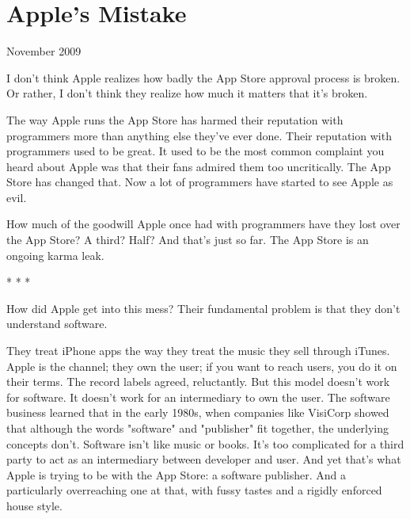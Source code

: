 \chapter{Apple's Mistake}


            
              
                


                  
                    November 2009

I don't think Apple realizes how
                    badly the App Store approval process is broken. Or rather, I
                    don't think they realize how much it matters that it's
                    broken.

The way Apple runs the App Store has
                    harmed their reputation with programmers more than anything
                    else they've ever done. Their reputation with programmers
                    used to be great. It used to be the most common complaint
                    you heard about Apple was that their fans admired them too
                    uncritically. The App Store has changed that. Now a lot of
                    programmers have started to see Apple as evil.

How
                    much of the goodwill Apple once had with programmers have
                    they lost over the App Store? A third? Half? And that's just
                    so far. The App Store is an ongoing karma leak.


                    
* * *
                    

How did Apple get into this mess? Their
                    fundamental problem is that they don't understand
                    software.

They treat iPhone apps the way they
                    treat the music they sell through iTunes. Apple is the
                    channel; they own the user; if you want to reach users, you
                    do it on their terms. The record labels agreed, reluctantly.
                    But this model doesn't work for software. It doesn't work
                    for an intermediary to own the user. The software business
                    learned that in the early 1980s, when companies like
                    VisiCorp showed that although the words "software" and
                    "publisher" fit together, the underlying concepts don't.
                    Software isn't like music or books. It's too complicated for
                    a third party to act as an intermediary between developer
                    and user. And yet that's what Apple is trying to be with the
                    App Store: a software publisher. And a particularly
                    overreaching one at that, with fussy tastes and a rigidly
                    enforced house style.


